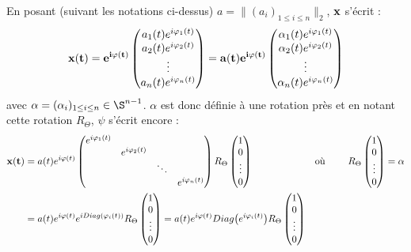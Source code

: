 \begin{remarque}
	En posant (suivant les notations ci-dessus) $a = \big\|(a_i)_{1\leq i\leq n}\big\|_2$, $\bf{x}$ s'écrit :
	\[\bf{x}(t) = e^{i\varphi(t)}\begin{pmatrix} a_1(t)e^{i\varphi_1(t)} \\ a_2(t)e^{i\varphi_2(t)} \\ \vdots \\ a_n(t)e^{i\varphi_n(t)}
	\end{pmatrix} = a(t)e^{i\varphi(t)}\begin{pmatrix} \alpha_1(t)e^{i\varphi_1(t)} \\ \alpha_2(t)e^{i\varphi_2(t)} \\ \vdots \\ \alpha_n(t)e^{i\varphi_n(t)} \end{pmatrix}\]
	avec $\alpha = (\alpha_i)_{1\leq i\leq n} \in \S^{n-1}$. $\alpha$ est donc définie à une rotation près et en notant cette rotation $R_\Theta$, $\psi$ s'écrit encore :
	\begin{align*}
		\bf{x}(t) &= a(t)e^{i\varphi(t)}\begin{pmatrix} e^{i\varphi_1(t)} \\ & e^{i\varphi_2(t)} \\  & & \ddots \\ & & & e^{i\varphi_n(t)}\end{pmatrix} R_\Theta\begin{pmatrix} 1 \\ 0 \\ \vdots \\ 0 \end{pmatrix}   &  \text{où }\qquad R_\Theta\begin{pmatrix} 1 \\ 0 \\ \vdots \\ 0 \end{pmatrix} = \alpha\\
		&= a(t)e^{i\varphi(t)}e^{iDiag(\varphi_i(t))} R_\Theta\begin{pmatrix} 1 \\ 0 \\ \vdots \\ 0 \end{pmatrix} = a(t)e^{i\varphi(t)}Diag\big(e^{i\varphi_i(t)}\big) R_\Theta\begin{pmatrix} 1 \\ 0 \\ \vdots \\ 0 \end{pmatrix}
	\end{align*}
\end{remarque}

